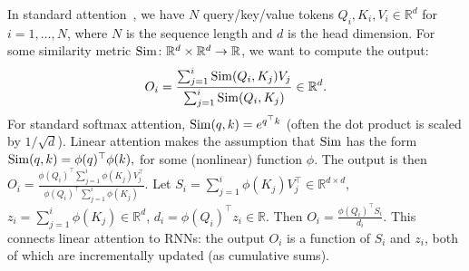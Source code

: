 In standard attention~\citep{vaswani2017attention}, we have $N$ query/key/value tokens $Q_i, K_i, V_i \in \mathbb{R}^d$ for
$i = 1, \dots, N$, where $N$ is the sequence length and $d$ is the head dimension.
For some similarity metric $\mathrm{Sim} \colon \mathbb{R}^d \times \mathbb{R}^d \to \mathbb{R}$, we want to compute the output:
\begin{equation*}
  O_i = \frac{\sum_{j=1}^i\mathrm{Sim}(Q_i, K_j) V_j}{\sum_{j=1}^i \mathrm{Sim}(Q_i, K_j)} \in \mathbb{R}^d.
\end{equation*}
For standard softmax attention, $\mathrm{Sim}(q, k) = e^{q^\top k}$ (often the dot
product is scaled by $1/\sqrt{d}$).
Linear attention makes the assumption that $\mathrm{Sim}$ has the form
$\mathrm{Sim}(q, k) = \phi(q)^\top \phi(k),$
for some (nonlinear) function $\phi$.
The output is then $O_i = \frac{\phi(Q_i)^\top \sum_{j=1}^{i} \phi(K_j) V_j^\top }{\phi(Q_i)^\top \sum_{j=1}^{i} \phi(K_j)}$.
Let
$S_i = \sum_{j=1}^{i} \phi(K_j) V_j^\top \in \mathbb{R}^{d \times d}$, $z_i = \sum_{j=1}^{i} \phi(K_j) \in \mathbb{R}^d$, $d_i = \phi(Q_{i})^\top z_i \in \mathbb{R}$.
Then $O_i = \frac{\phi(Q_i)^\top S_i}{d_i}$.
This connects linear attention to RNNs: the output $O_i$ is a function of $S_i$
and $z_i$, both of which are incrementally updated (as cumulative sums).

